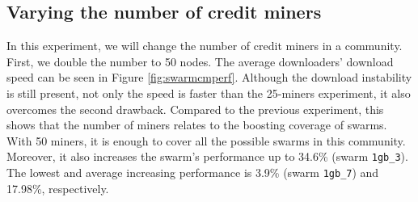 \subsection{Varying the number of credit miners}
In this experiment, we will change the number of credit miners in a community. First, we double the number to 50 nodes. The average downloaders' download speed can be seen in Figure \ref{fig:swarmcmperf}. Although the download instability is still present, not only the speed is faster than the 25-miners experiment, it also overcomes the second drawback. Compared to the previous experiment, this shows that the number of miners relates to the boosting coverage of swarms. With 50 miners, it is enough to cover all the possible swarms in this community. Moreover, it also increases the swarm's performance up to 34.6\% (swarm \texttt{1gb\_3}). The lowest and average increasing performance is 3.9\% (swarm \texttt{1gb\_7}) and 17.98\%, respectively.


